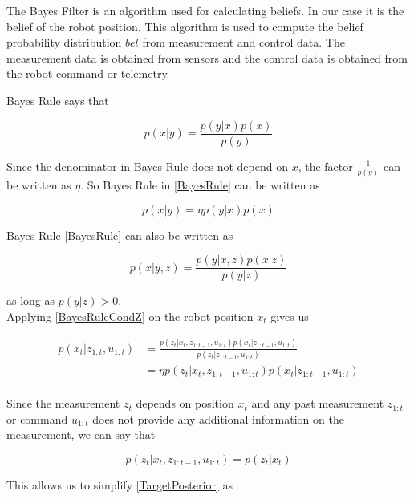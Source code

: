 \documentclass[conference]{IEEEtran}
\begin{document}
The Bayes Filter is an algorithm used for calculating beliefs\cite{thrun}. In our case it is the belief of the robot position. This algorithm is used to compute the belief probability distribution $bel$ from measurement and control data. The measurement data is obtained from sensors and the control data is obtained from the robot command or telemetry. 

Bayes Rule says that

\begin{equation}\label{BayesRule}
p(x|y) = \frac{p(y|x) p(x)}{p(y)}
\end{equation}

Since the denominator in Bayes Rule does not depend on $x$, the factor $\frac{1}{p(y)}$ can be written as $\eta$. So Bayes Rule in \ref{BayesRule} can be written as

\begin{equation}\label{BayesRuleEta}
p(x|y) = \eta p(y|x) p(x)
\end{equation}

Bayes Rule \ref{BayesRule} can also be written as 

\begin{equation}\label{BayesRuleCondZ}
p(x|y,z) = \frac{p(y|x,z) p(x|z)}{p(y|z)}
\end{equation}

as long as $p(y|z)>0$.\\

Applying \ref{BayesRuleCondZ} on the robot position $x_t$ gives us

\begin{equation}\label{TargetPosterior}
\begin{aligned}
p(x_t|z_{1:t},u_{1:t}) &= \frac{p(z_t|x_t,z_{1:t-1},u_{1:t}) p(x_t|z_{1:t-1},u_{1:t})}{p(z_t|z_{1:t-1},u_{1:t})}\\
& = \eta p(z_t|x_t,z_{1:t-1},u_{1:t}) p(x_t|z_{1:t-1},u_{1:t})\\
\end{aligned}
\end{equation}

Since the measurement $z_t$ depends on position $x_t$ and any past measurement $z_{1:t}$ or command $u_{1:t} $ does not provide any additional information on the measurement, we can say that

\begin{equation}\label{SimplTargPost}
p(z_t|x_t,z_{1:t-1},u_{1:t}) = p(z_t|x_t)
\end{equation}

This allows us to simplify \ref{TargetPosterior} as
\end{document}
